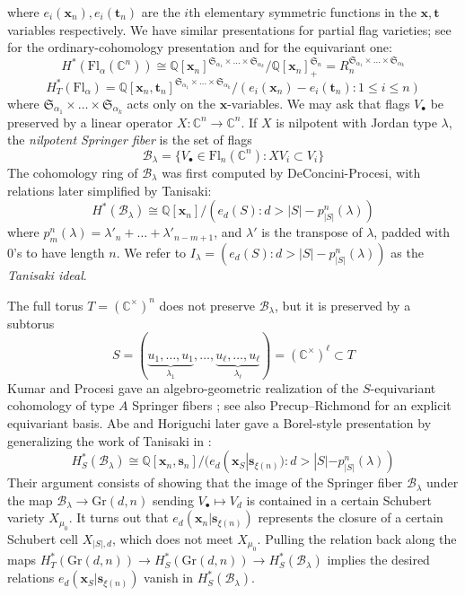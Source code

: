 \documentclass[11pt]{amsart}
\numberwithin{equation}{section}
\theoremstyle{definition}
\newcommand{\symm}{{\mathfrak{S}}}
\newcommand{\Gr}{{\mathrm {Gr}}}
\newcommand{\BBB}{{\mathcal{B}}}
\newcommand{\CC}{{\mathbb{C}}}
\newcommand{\QQ}{{\mathbb{Q}}}
\newcommand{\xxx}{{\mathbf{x}}}
\newcommand{\ttt}{{\mathbf{t}}}
\newcommand{\sss}{{\mathbf{s}}}
\newcommand{\Fl}{\text{Fl}}
\begin{document}
where $e_i(\xxx_n), e_i(\ttt_n)$ are the $i$th elementary symmetric functions in the $\xxx,\ttt$ variables respectively. We have similar presentations for partial flag varieties; see \cite{Borel1953}
for the ordinary-cohomology presentation and
\cite[Chapter~4, Corollary~5.4]{AF} for the equivariant one:
\[
H^*(\Fl_\alpha(\CC^n)) \cong \QQ[\xxx_n]^{\symm_{\alpha_1} \times \dots \times \symm_{\alpha_k}}/\QQ[\xxx_n]^{\symm_n}_+ = R_n^{\symm_{\alpha_1} \times \dots \times \symm_{\alpha_k}}
\]
\[
H^*_T(\Fl_\alpha) = \QQ[\xxx_n,\ttt_n]^{\symm_{\alpha_1} \times \dots \times \symm_{\alpha_k}}/(e_i(\xxx_n) - e_i(\ttt_n) : 1 \leq i \leq n)
\]
where $\symm_{\alpha_1} \times \dots \times \symm_{\alpha_k}$ acts only on the $\xxx$-variables.
We may ask that flags $V_\bullet$ be preserved by a linear operator $X: \CC^n \to \CC^n$. If $X$ is nilpotent with Jordan type $\lambda$, the \emph{nilpotent Springer fiber} is the set of flags
\[
\BBB_\lambda = \{ V_\bullet \in \Fl_n(\CC^n) : XV_i \subset V_i \}
\]
The cohomology ring of $\BBB_\lambda$ was first computed by DeConcini-Procesi, with relations later simplified by Tanisaki:
\[
H^*(\BBB_\lambda) \cong \QQ[\xxx_n]/( e_d(S): d > |S| - p^n_{|S|}(\lambda) )
\]
where $p^n_m(\lambda) = \lambda'_n + \dots + \lambda'_{n-m+1}$, and $\lambda'$ is the transpose of $\lambda$, padded with $0$'s to have length $n$. We refer to $I_\lambda = (e_d(S): d > |S|-p^n_{|S|}(\lambda))$ as the \emph{Tanisaki ideal}. 

The full torus $T=(\CC^\times)^n$ does not preserve $\BBB_\lambda$, but it is preserved by a subtorus 
\[
S = (\underbrace{u_1,\dots,u_1}_{\lambda_1},\dots,\underbrace{u_\ell,\dots,u_\ell}_{\lambda_\ell}) = (\CC^\times)^\ell \subset T
\]
Kumar and Procesi gave an algebro-geometric realization of the
$S$-equivariant cohomology of type $A$ Springer fibers \cite{KumarProcesi2012}; see also
Precup--Richmond \cite{PrecupRichmond2021} for an explicit equivariant basis. Abe and
Horiguchi \cite{AH} later gave a Borel-style presentation by generalizing the work of Tanisaki in \cite{T}:
\[
H^*_S(\BBB_\lambda) \cong \QQ[\xxx_n,\sss_n] / (e_d(\xxx_S|\sss_{\xi(n)}) : d > |S|-p^n_{|S|}(\lambda))
\]
Their argument consists of showing that the image of the Springer fiber $\BBB_\lambda$ under the map $\BBB_\lambda \to \Gr(d,n)$ sending $V_\bullet \mapsto V_d$ is contained in a certain Schubert variety $X_{\mu_0}$. It turns out that $e_d(\xxx_n|\sss_{\xi(n)})$ represents the closure of a certain Schubert cell $X_{|S|,d}$, which does not meet $X_{\mu_0}$. Pulling the relation back along the maps $H^*_T(\Gr(d,n)) \to H^*_S(\Gr(d,n)) \to H^*_S(\BBB_\lambda)$ implies the desired relations $e_d(\xxx_S|\sss_{\xi(n)})$ vanish in $H^*_S(\BBB_\lambda)$.
\end{document}
